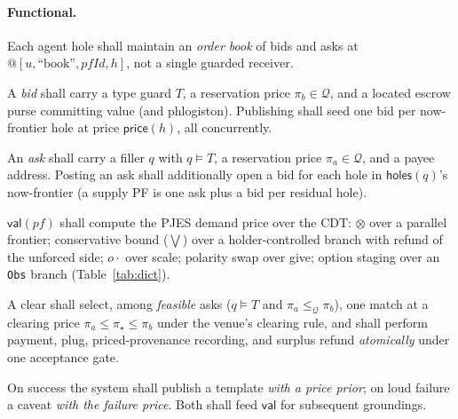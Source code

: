 \documentclass[11pt]{article}
\theoremstyle{definition}
\newcommand{\PF}{\textsf{PF}}
\newcommand{\CDT}{\textsf{CDT}}
\newcommand{\holes}{\textsf{holes}}
\newcommand{\val}{\ensuremath{\mathsf{val}}}
\newcommand{\price}{\ensuremath{\mathsf{price}}}
\newcommand{\Qval}{\mathcal{Q}}            %
\newcommand{\modelsT}{\models}
\begin{document}
\paragraph{Functional.}
\begin{description}[leftmargin=3.2em,style=nextline,font=\normalfont\bfseries]
\item[FR-12] Each agent hole shall maintain an \emph{order book} of bids and asks at
$@[u,\text{``book''},pfId,h]$, not a single guarded receiver.
\item[FR-13] A \emph{bid} shall carry a type guard $T$, a reservation price $\pi_b\in\Qval$, and a
located escrow purse committing value (and phlogiston). Publishing shall seed one bid per
now-frontier hole at price $\price(h)$, all concurrently.
\item[FR-14] An \emph{ask} shall carry a filler $q$ with $q\modelsT T$, a reservation price
$\pi_a\in\Qval$, and a payee address. Posting an ask shall additionally open a bid for each hole in
$\holes(q)$'s now-frontier (a supply \PF{} is one ask plus a bid per residual hole).
\item[FR-15] $\val(pf)$ shall compute the PJES demand price over the \CDT{}: $\otimes$ over a parallel
frontier; conservative bound ($\bigvee$) over a holder-controlled branch with refund of the unforced
side; $o\cdot$ over \textsf{scale}; polarity swap over \textsf{give}; option staging over an
\texttt{Obs} branch (Table~\ref{tab:dict}).
\item[FR-16] A clear shall select, among \emph{feasible} asks ($q\modelsT T$ and
$\pi_a\le_\Qval\pi_b$), one match at a clearing price $\pi_a\le\pi_\star\le\pi_b$ under the venue's
clearing rule, and shall perform payment, plug, priced-provenance recording, and surplus refund
\emph{atomically} under one acceptance gate.
\item[FR-17] On success the system shall publish a template \emph{with a price prior}; on loud failure
a caveat \emph{with the failure price}. Both shall feed $\val$ for subsequent groundings.
\end{description}
\end{document}
